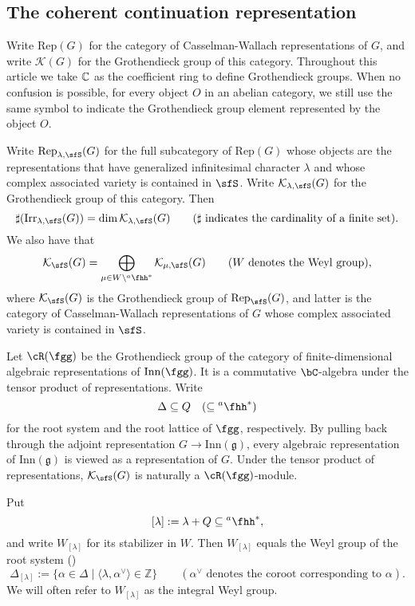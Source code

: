 \documentclass[12pt,a4paper]{amsart}
\def\subset{\subseteq}
\newcommand{\CK}{{\mathcal {K}}}
\newcommand{\g}{\mathfrak g}
\newcommand{\Z}{\mathbb{Z}}
\numberwithin{equation}{section}
\theoremstyle{remark}
\def\Irr{\mathrm{Irr}}
\def\hha{{}^a\fhh}
\newcommand{\Lam}{{[\lambda]}}
\newcommand{\Rg}{\cR(\fgg)}
\begin{document}
\subsection{The coherent continuation representation}\label{sec11}


Write $\mathrm{Rep}(G)$ for the category of Casselman-Wallach representations of $G$, and write $\CK(G)$ for the
Grothendieck group of this category.  Throughout this article we take $\mathbb{C}$ as the coefficient ring to define  Grothendieck groups.
When no confusion is possible, for every object $O$ in an abelian category, we  still use the same symbol to indicate the Grothendieck group element represented by the object $O$.


Write $\mathrm{Rep}_{\lambda, \sfS}(G)$ for the full subcategory of $\mathrm{Rep}(G)$ whose objects are the representations that have
generalized infinitesimal character $\lambda$ and whose complex associated
variety is contained in $\sfS$. Write $\CK_{\lambda,\sfS}(G)$ for the
Grothendieck group of this category. Then
\[
  \sharp (\Irr_{\lambda,\sfS}(G))=\dim \CK_{\lambda,\sfS}(G)\qquad(\sharp\textrm{
    indicates the cardinality of a finite set}).
\]
We also have that
\[
  \CK_\sfS(G)=\bigoplus_{\mu\in W\backslash \hha^*} \CK_{\mu,\sfS}(G)\qquad (W\textrm{
    denotes the Weyl group}),
\]
where $\CK_{\sfS}(G)$ is the Grothendieck group of $\mathrm{Rep}_\sfS(G)$, and latter is the
category of Casselman-Wallach representations of $G$ whose complex associated
variety is contained in $\sfS$.


Let $\Rg$ be the Grothendieck group of the category of finite-dimensional algebraic
representations of $\mathrm{Inn}(\fgg)$. It is
 a commutative $\bC$-algebra under the tensor
product of representations.
Write \[
\Delta\subset Q \quad (\subset \hha^*)
\] for the root system and the root lattice of
$\fgg$, respectively.
By pulling back through the adjoint representation
$G\rightarrow \mathrm{Inn}(\g)$, every algebraic representation of $\mathrm{Inn}(\g)$ is viewed as a representation of $G$.
Under the tensor product of representations, $\CK_\sfS(G)$ is naturally a $\Rg$-module.


Put
\[
\Lam:=\lambda+Q\subset \hha^*,
\]
 and write $W_\Lam$
for its stabilizer in $W$. Then $W_\Lam$ equals the Weyl group of the root
system  (\cite[Section 1.3]{Jan})
\[
\Delta_\Lam:=  \{\alpha \in \Delta\mid \langle \lambda, \alpha^\vee\rangle \in \Z\}\qquad (\alpha^\vee \textrm{ denotes the coroot corresponding to $\alpha$}).
\]
We will often refer to $W_\Lam$ as the integral Weyl group.
\end{document}
